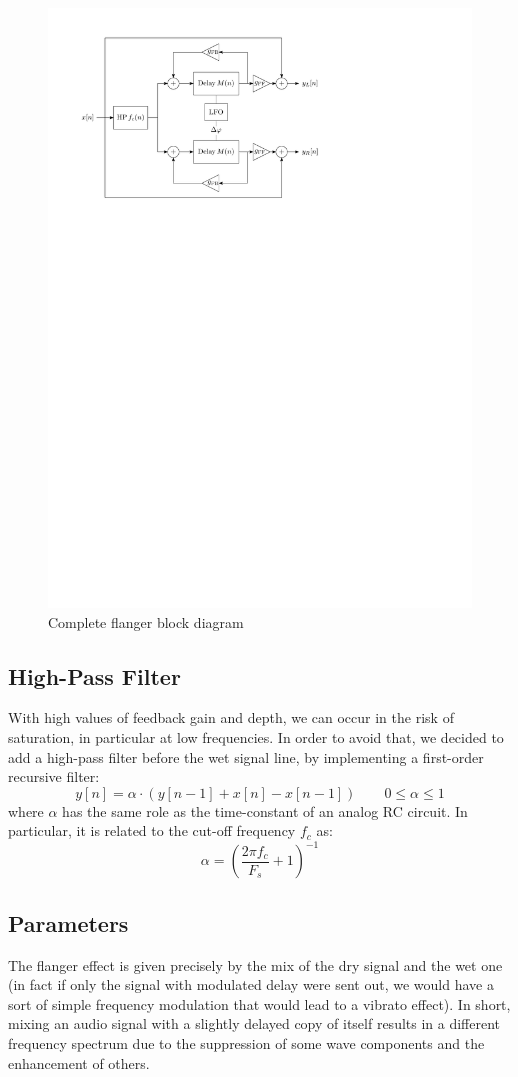 \begin{figure}
	\centering
	\includegraphics[width=0.7\linewidth]{assets/diagram-full.pdf}
	\caption{Complete flanger block diagram}
	\label{fig:diag}
\end{figure}

\subsection{High-Pass Filter}\label{sec:hpf}

With high values of feedback gain and depth, we can occur in the risk of saturation, in particular at low frequencies. In order to avoid that, we decided to add a high-pass filter before the wet signal line, by implementing a first-order recursive filter:
\[
y[n] = \alpha \cdot \left( y[n-1] + x[n] - x[n-1] \right)
\qquad
0 \le \alpha \le 1
\]
where $\alpha$ has the same role as the time-constant of an analog RC circuit.
In particular, it is related to the cut-off frequency $f_c$ as:
\[
\alpha = \left( \frac{2 \pi f_c}{F_s} + 1 \right)^{-1}
\]

\subsection{Parameters}\label{sec:parameters}

The flanger effect is given precisely by the mix of the dry signal and the wet one (in fact if only the signal with modulated delay were sent out, we would have a sort of simple frequency modulation that would lead to a vibrato effect). In short, mixing an audio signal with a slightly delayed copy of itself results in a different frequency spectrum due to the suppression of some wave components and the enhancement of others.

